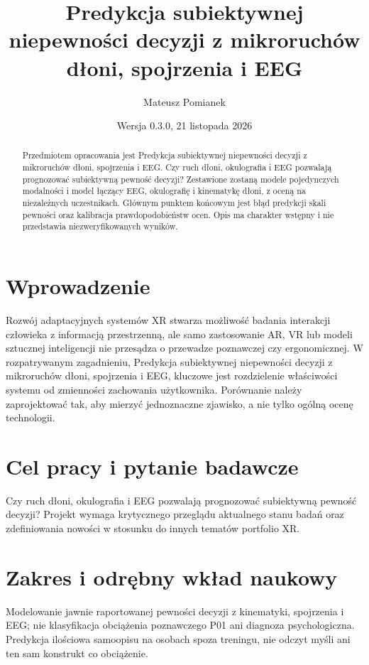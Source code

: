 \documentclass[11pt,a4paper]{article}
\title{Predykcja subiektywnej niepewności decyzji z mikroruchów dłoni, spojrzenia i EEG}
\author{Mateusz Pomianek}
\date{Wersja 0.3.0, 21 listopada 2026}
\begin{document}
\maketitle

\begin{abstract}

Przedmiotem opracowania jest Predykcja subiektywnej niepewności decyzji z mikroruchów dłoni, spojrzenia i EEG. Czy ruch dłoni, okulografia i EEG pozwalają prognozować subiektywną pewność decyzji? Zestawione zostaną modele pojedynczych modalności i model łączący EEG, okulografię i kinematykę dłoni, z oceną na niezależnych uczestnikach. Głównym punktem końcowym jest błąd predykcji skali pewności oraz kalibracja prawdopodobieństw ocen. Opis ma charakter wstępny i nie przedstawia niezweryfikowanych wyników.

\end{abstract}

\section{Wprowadzenie}

Rozwój adaptacyjnych systemów XR stwarza możliwość badania interakcji człowieka z informacją przestrzenną, ale samo zastosowanie AR, VR lub modeli sztucznej inteligencji nie przesądza o przewadze poznawczej czy ergonomicznej. W rozpatrywanym zagadnieniu, Predykcja subiektywnej niepewności decyzji z mikroruchów dłoni, spojrzenia i EEG, kluczowe jest rozdzielenie właściwości systemu od zmienności zachowania użytkownika. Porównanie należy zaprojektować tak, aby mierzyć jednoznaczne zjawisko, a nie tylko ogólną ocenę technologii.

\section{Cel pracy i pytanie badawcze}

Czy ruch dłoni, okulografia i EEG pozwalają prognozować subiektywną pewność decyzji? Projekt wymaga krytycznego przeglądu aktualnego stanu badań oraz zdefiniowania nowości w stosunku do innych tematów portfolio XR.

\section{Zakres i odrębny wkład naukowy}
Modelowanie jawnie raportowanej pewności decyzji z kinematyki, spojrzenia i EEG; nie klasyfikacja obciążenia poznawczego P01 ani diagnoza psychologiczna. Predykcja ilościowa samoopisu na osobach spoza treningu, nie odczyt myśli ani ten sam konstrukt co obciążenie.
\end{document}
